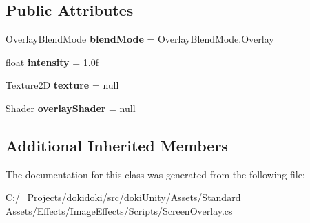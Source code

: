 \subsection*{Public Attributes}
\begin{DoxyCompactItemize}
\item 
Overlay\+Blend\+Mode {\bfseries blend\+Mode} = Overlay\+Blend\+Mode.\+Overlay\hypertarget{class_unity_standard_assets_1_1_image_effects_1_1_screen_overlay_a4b011caccdf62e51d74408722e9fcb78}{}\label{class_unity_standard_assets_1_1_image_effects_1_1_screen_overlay_a4b011caccdf62e51d74408722e9fcb78}

\item 
float {\bfseries intensity} = 1.\+0f\hypertarget{class_unity_standard_assets_1_1_image_effects_1_1_screen_overlay_a4a0a5bfcd436b7461f47ebf98acb3a04}{}\label{class_unity_standard_assets_1_1_image_effects_1_1_screen_overlay_a4a0a5bfcd436b7461f47ebf98acb3a04}

\item 
Texture2D {\bfseries texture} = null\hypertarget{class_unity_standard_assets_1_1_image_effects_1_1_screen_overlay_af6cbd5e2d8f6f08706eebca9d6536362}{}\label{class_unity_standard_assets_1_1_image_effects_1_1_screen_overlay_af6cbd5e2d8f6f08706eebca9d6536362}

\item 
Shader {\bfseries overlay\+Shader} = null\hypertarget{class_unity_standard_assets_1_1_image_effects_1_1_screen_overlay_aad28704b47487353cf8d3b8a5e671d56}{}\label{class_unity_standard_assets_1_1_image_effects_1_1_screen_overlay_aad28704b47487353cf8d3b8a5e671d56}

\end{DoxyCompactItemize}
\subsection*{Additional Inherited Members}


The documentation for this class was generated from the following file\+:\begin{DoxyCompactItemize}
\item 
C\+:/\+\_\+\+Projects/dokidoki/src/doki\+Unity/\+Assets/\+Standard Assets/\+Effects/\+Image\+Effects/\+Scripts/Screen\+Overlay.\+cs\end{DoxyCompactItemize}
